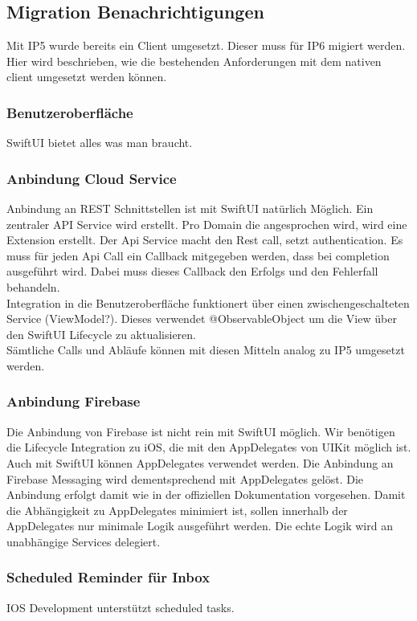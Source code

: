 \subsection{Migration Benachrichtigungen}

Mit IP5 wurde bereits ein Client umgesetzt.
Dieser muss für IP6 migiert werden.
Hier wird beschrieben, wie die bestehenden Anforderungen mit dem nativen client umgesetzt werden können.

\subsubsection*{Benutzeroberfläche}
SwiftUI bietet alles was man braucht.


\subsubsection*{Anbindung Cloud Service}
Anbindung an REST Schnittstellen ist mit SwiftUI natürlich Möglich.
Ein zentraler API Service wird erstellt.
Pro Domain die angesprochen wird, wird eine Extension erstellt.
Der Api Service macht den Rest call, setzt authentication.
Es muss für jeden Api Call ein Callback mitgegeben werden, dass bei completion ausgeführt wird.
Dabei muss dieses Callback den Erfolgs und den Fehlerfall behandeln. \\

Integration in die Benutzeroberfläche funktionert über einen zwischengeschalteten Service (ViewModel?).
Dieses verwendet @ObservableObject um die View über den SwiftUI Lifecycle zu aktualisieren. \\

Sämtliche Calls und Abläufe können mit diesen Mitteln analog zu IP5 umgesetzt werden.


\subsubsection*{Anbindung Firebase}

Die Anbindung von Firebase ist nicht rein mit SwiftUI möglich.
Wir benötigen die Lifecycle Integration zu iOS, die mit den AppDelegates von UIKit möglich ist.
Auch mit SwiftUI können AppDelegates verwendet werden.
Die Anbindung an Firebase Messaging wird dementsprechend mit AppDelegates gelöst.
Die Anbindung erfolgt damit wie in der offiziellen Dokumentation vorgesehen.
Damit die Abhängigkeit zu AppDelegates minimiert ist, sollen innerhalb der AppDelegates nur minimale Logik ausgeführt werden.
Die echte Logik wird an unabhängige Services delegiert.


\subsubsection*{Scheduled Reminder für Inbox}
IOS Development unterstützt scheduled tasks.

\clearpage
